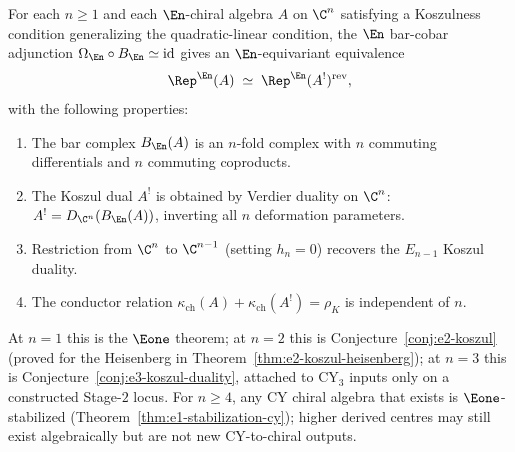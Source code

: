 \begin{conjecture}
\label{conj:en-koszul-cascade}
\ClaimStatusConjectured
For each $n \geq 1$ and each $\En$-chiral algebra $A$ on $\C^n$ satisfying a Koszulness condition generalizing the quadratic-linear condition, the $\En$ bar-cobar adjunction $\Omega_{\En} \circ B_{\En} \simeq \mathrm{id}$ gives an $\En$-equivariant equivalence
\[
 \Rep^{\En}(A) \;\simeq\; \Rep^{\En}(A^!)^{\mathrm{rev}},
\]
with the following properties:
\begin{enumerate}[label=\textup{(\roman*)}]
 \item The bar complex $B_{\En}(A)$ is an $n$-fold complex with $n$ commuting differentials and $n$ commuting coproducts.
 \item The Koszul dual $A^!$ is obtained by Verdier duality on $\C^n$: $A^! = D_{\C^n}(B_{\En}(A))$, inverting all $n$ deformation parameters.
 \item Restriction from $\C^n$ to $\C^{n-1}$ (setting $h_n = 0$) recovers the $E_{n-1}$ Koszul duality.
 \item The conductor relation $\kappa_{\mathrm{ch}}(A) + \kappa_{\mathrm{ch}}(A^!) = \rho_K$ is independent of $n$.
\end{enumerate}
At $n = 1$ this is the $\Eone$ theorem; at $n = 2$ this is Conjecture~\ref{conj:e2-koszul} (proved for the Heisenberg in Theorem~\ref{thm:e2-koszul-heisenberg}); at $n = 3$ this is Conjecture~\ref{conj:e3-koszul-duality}, attached to CY$_3$ inputs only on a constructed Stage-$2$ locus. For $n \geq 4$, any CY chiral algebra that exists is $\Eone$-stabilized (Theorem~\ref{thm:e1-stabilization-cy}); higher derived centres may still exist algebraically but are not new CY-to-chiral outputs.
\end{conjecture}

